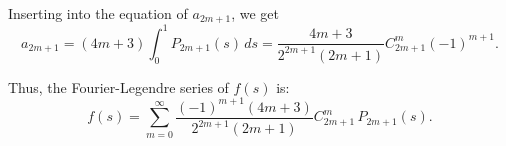 
Inserting into the equation of $a_{2m+1}$, we get 
\[
a_{2m+1} = (4m + 3) \int_0^1 P_{2m+1}(s) \, ds = \frac{4m + 3}{2^{2m+1} (2m+1)} C_{2m+1}^{m} (-1)^{m+1}.
\]

Thus, the Fourier-Legendre series of \( f(s) \) is:
\[
f(s) = \sum_{m=0}^\infty \frac{(-1)^{m+1}(4m + 3)}{2^{2m+1} (2m+1)} C_{2m+1}^{m} \, P_{2m+1}(s).
\]